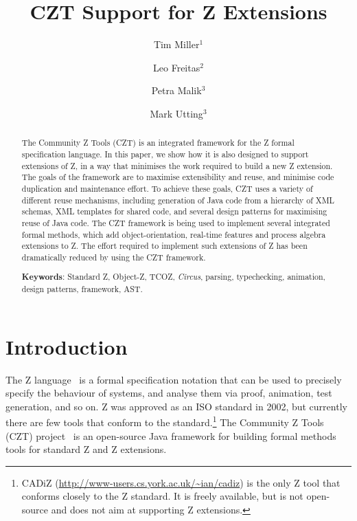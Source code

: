 \documentclass{llncs}
\newcommand{\Circus}{{\sf\slshape Circus}}
\begin{document}
\title{CZT Support for Z Extensions}
\author{Tim Miller$^1$ \and Leo Freitas$^2$ \and Petra Malik$^3$ \and Mark Utting$^3$}


\maketitle


\begin{abstract}
  The Community Z Tools (CZT) is an integrated
  framework for the Z formal specification language.  In this
  paper, we show how it is also designed to support extensions
  of Z, in a way that minimises the work required to build a
  new Z extension.  The goals of the framework are to maximise
  extensibility and reuse, and minimise code duplication and
  maintenance effort.  To achieve these goals, CZT uses a variety of
  different reuse mechanisms, including generation of Java
  code from a hierarchy of XML schemas, XML templates for shared
  code, and several design patterns for maximising reuse of Java
  code.
  The CZT framework is being used to implement several integrated
  formal methods, which add object-orientation, real-time features
  and process algebra extensions to Z.  The effort required to
  implement such extensions of Z has been dramatically reduced
  by using the CZT framework.

  \noindent
  \textbf{Keywords}: Standard Z, Object-Z, TCOZ, \Circus, parsing,
     typechecking, animation, design patterns, framework, AST.
\end{abstract}

\section{Introduction} \label{sec:intro}

  The Z language~\cite{isoz} is a formal specification notation that
  can be used to precisely specify the behaviour of systems, and
  analyse them via proof, animation, test generation, and so on.
  Z was approved as an ISO standard in 2002, but currently there are few
  tools that conform to the standard.\footnote{CADiZ
  (\url{http://www-users.cs.york.ac.uk/~ian/cadiz}) is the only Z tool
  that conforms closely to the Z standard.  It is freely available,
  but is not open-source and does not aim at supporting Z extensions.}
  The Community Z Tools (CZT) project~\cite{czt} is an open-source Java
  framework for building formal methods tools for standard Z and Z extensions.
\end{document}
